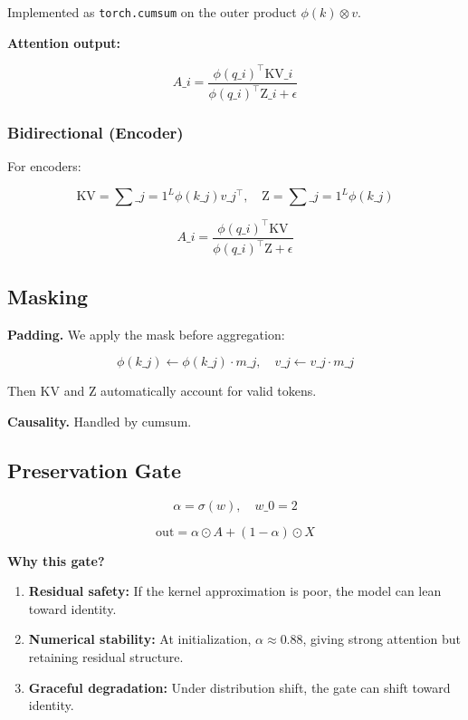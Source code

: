 Implemented as \texttt{torch.cumsum} on the outer product $\phi(k) \otimes v$.

\textbf{Attention output:}

\[
A\_i = \frac{\phi(q\_i)^\top \text{KV}\_i}{\phi(q\_i)^\top \text{Z}\_i + \epsilon}
\tag{4.9}
\]

\subsubsection{Bidirectional (Encoder)}

For encoders:

\[
\text{KV} = \sum\_{j=1}^L \phi(k\_j) v\_j^\top, \quad
\text{Z} = \sum\_{j=1}^L \phi(k\_j)
\tag{4.10}
\]

\[
A\_i = \frac{\phi(q\_i)^\top \text{KV}}{\phi(q\_i)^\top \text{Z} + \epsilon}
\tag{4.11}
\]

\subsection{Masking}

\textbf{Padding.} We apply the mask before aggregation:

\[
\phi(k\_j) \leftarrow \phi(k\_j) \cdot m\_j, \quad
v\_j \leftarrow v\_j \cdot m\_j
\tag{4.12}
\]

Then $\text{KV}$ and $\text{Z}$ automatically account for valid tokens.

\textbf{Causality.} Handled by cumsum.

\subsection{Preservation Gate}

\[
\alpha = \sigma(w), \quad w\_0 = 2
\tag{4.13}
\]

\[
\text{out} = \alpha \odot A + (1 - \alpha) \odot X
\tag{4.14}
\]

\textbf{Why this gate?}

\begin{enumerate}
\item \textbf{Residual safety:} If the kernel approximation is poor, the model
  can lean toward identity.
\item \textbf{Numerical stability:} At initialization, $\alpha \approx 0.88$,
  giving strong attention but retaining residual structure.
\item \textbf{Graceful degradation:} Under distribution shift, the gate can
  shift toward identity.

\end{enumerate}
